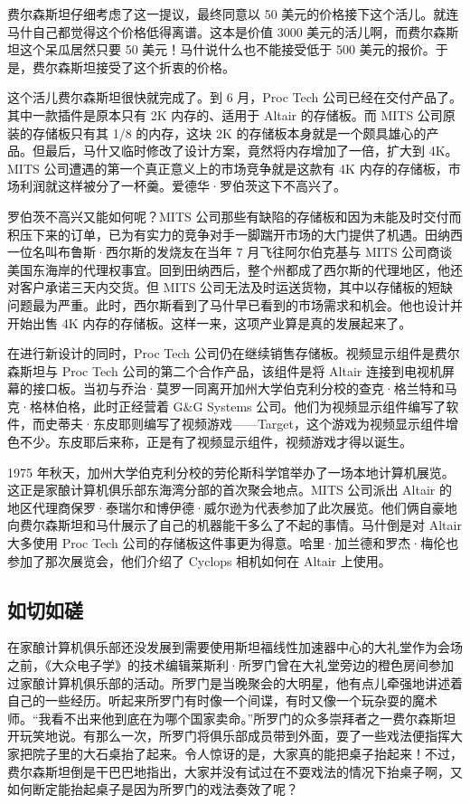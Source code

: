 \documentclass[12pt,UTF8]{ctexbook}
\begin{document}
费尔森斯坦仔细考虑了这一提议，最终同意以 50 美元的价格接下这个活儿。就连马什自己都觉得这个价格低得离谱。这本是价值 3000 美元的活儿啊，而费尔森斯坦这个呆瓜居然只要 50 美元！马什说什么也不能接受低于 500 美元的报价。于是，费尔森斯坦接受了这个折衷的价格。

这个活儿费尔森斯坦很快就完成了。到 6 月，Proc Tech 公司已经在交付产品了。其中一款插件是原本只有 2K 内存的、适用于 Altair 的存储板。而 MITS 公司原装的存储板只有其 1/8 的内存，这块 2K 的存储板本身就是一个颇具雄心的产品。但最后，马什又临时修改了设计方案，竟然将内存增加了一倍，扩大到 4K。MITS 公司遭遇的第一个真正意义上的市场竞争就是这款有 4K 内存的存储板，市场利润就这样被分了一杯羹。爱德华·罗伯茨这下不高兴了。

罗伯茨不高兴又能如何呢？MITS 公司那些有缺陷的存储板和因为未能及时交付而积压下来的订单，已为有实力的竞争对手一脚踹开市场的大门提供了机遇。田纳西一位名叫布鲁斯·西尔斯的发烧友在当年 7 月飞往阿尔伯克基与 MITS 公司商谈美国东海岸的代理权事宜。回到田纳西后，整个州都成了西尔斯的代理地区，他还对客户承诺三天内交货。但 MITS 公司无法及时运送货物，其中以存储板的短缺问题最为严重。此时，西尔斯看到了马什早已看到的市场需求和机会。他也设计并开始出售 4K 内存的存储板。这样一来，这项产业算是真的发展起来了。

在进行新设计的同时，Proc Tech 公司仍在继续销售存储板。视频显示组件是费尔森斯坦与 Proc Tech 公司的第二个合作产品，该组件是将 Altair 连接到电视机屏幕的接口板。当初与乔治·莫罗一同离开加州大学伯克利分校的查克·格兰特和马克·格林伯格，此时正经营着 G\&G Systems 公司。他们为视频显示组件编写了软件，而史蒂夫·东皮耶则编写了视频游戏——Target，这个游戏为视频显示组件增色不少。东皮耶后来称，正是有了视频显示组件，视频游戏才得以诞生。

1975 年秋天，加州大学伯克利分校的劳伦斯科学馆举办了一场本地计算机展览。这正是家酿计算机俱乐部东海湾分部的首次聚会地点。MITS 公司派出 Altair 的地区代理商保罗·泰瑞尔和博伊德·威尔逊为代表参加了此次展览。他们俩自豪地向费尔森斯坦和马什展示了自己的机器能干多么了不起的事情。马什倒是对 Altair 大多使用 Proc Tech 公司的存储板这件事更为得意。哈里·加兰德和罗杰·梅伦也参加了那次展览会，他们介绍了 Cyclops 相机如何在 Altair 上使用。





\subsection{如切如磋}


在家酿计算机俱乐部还没发展到需要使用斯坦福线性加速器中心的大礼堂作为会场之前，《大众电子学》的技术编辑莱斯利·所罗门曾在大礼堂旁边的橙色房间参加过家酿计算机俱乐部的活动。所罗门是当晚聚会的大明星，他有点儿牵强地讲述着自己的一些经历。听起来所罗门有时像一个间谍，有时又像一个玩杂耍的魔术师。“我看不出来他到底在为哪个国家卖命。”所罗门的众多崇拜者之一费尔森斯坦开玩笑地说。有那么一次，所罗门将俱乐部成员带到外面，耍了一些戏法便指挥大家把院子里的大石桌抬了起来。令人惊讶的是，大家真的能把桌子抬起来！不过，费尔森斯坦倒是干巴巴地指出，大家并没有试过在不耍戏法的情况下抬桌子啊，又如何断定能抬起桌子是因为所罗门的戏法奏效了呢？
\end{document}
